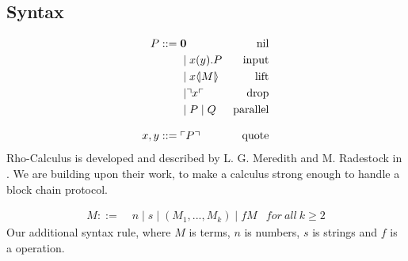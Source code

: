 \subsection{Syntax}
\begin{align*}
P  ::= \; &  \mathbf{0} & \text{nil} \\
  & \mid x(y).P & \text{input} \\
  & \mid x \langle \! | M | \! \rangle & \text{lift} \\
  & \mid \urcorner x \ulcorner & \text{drop} \\
  & \mid P \mid Q & \text{parallel} \\[3mm]
x,y ::= \; & \ulcorner P \urcorner & \text{quote}\\\end{align*}
Rho-Calculus is developed and described by L. G. Meredith and M. Radestock in \citep{Meredith2005}. We are building upon their work, to make a calculus strong enough to handle a block chain protocol.

\begin{align*}
M::=\; & n \mid s \mid (M_1,...,M_k) \mid fM &for\ all\ k \geq 2
\end{align*}
Our additional syntax rule, where $M$ is terms, $n$ is numbers, $s$ is strings and $f$ is a operation.

